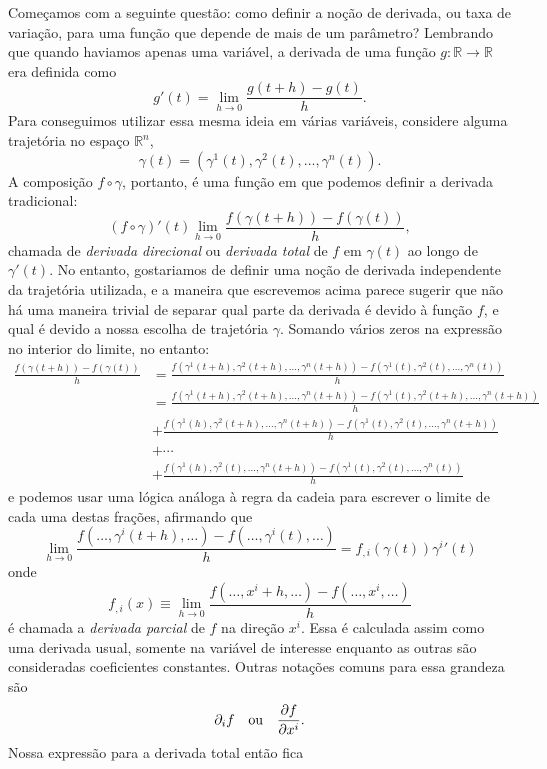 \documentclass[a4paper, 12pt]{article}
\newcommand{\pd}[3]{\ifblank{#3}{}{\left(}\frac{\partial #1}{\partial #2}\ifblank{#3}{}{\right)_{#3}}}
\theoremstyle{definition}
\theoremstyle{definition}
\begin{document}
Começamos com a seguinte questão: como definir a noção de derivada, ou taxa de variação, para uma função que
depende de mais de um parâmetro? Lembrando que quando haviamos apenas uma variável, a derivada de uma função
$g:\mathbb R\rightarrow\mathbb R$ era definida como
$$g'(t)=\lim\limits_{h\rightarrow0}\frac{g(t+h)-g(t)}{h}.$$
Para conseguimos utilizar essa mesma ideia em várias variáveis, considere alguma trajetória no espaço 
$\mathbb R^n$,
$$\gamma(t)=(\gamma^1(t),\gamma^2(t),\dots,\gamma^n(t)).$$
A composição $f\circ\gamma$, portanto, é uma função em que podemos definir a derivada tradicional:
$$(f\circ\gamma)'(t)\lim\limits_{h\rightarrow0}\frac{f(\gamma(t+h))-f(\gamma(t))}{h},$$
chamada de \textit{derivada direcional} ou \textit{derivada total} de $f$ em $\gamma(t)$ ao longo de $\gamma'(t)$. 
No entanto, gostariamos de definir uma noção de derivada independente da trajetória utilizada, e a maneira 
que escrevemos acima parece sugerir que não há uma maneira trivial de separar qual parte da derivada é devido à função $f$,
e qual é devido a nossa escolha de trajetória $\gamma$. Somando vários zeros na expressão no interior do limite, 
no entanto:
\begin{align*}
    \frac{f(\gamma(t+h))-f(\gamma(t))}{h}
    &=\frac{f(\gamma^1(t+h),\gamma^2(t+h),\dots,\gamma^n(t+h))-f(\gamma^1(t),\gamma^2(t),\dots,\gamma^n(t))}{h}\\
    &=\frac{f(\gamma^1(t+h),\gamma^2(t+h),\dots,\gamma^n(t+h))-f(\gamma^1(t),\gamma^2(t+h),\dots,\gamma^n(t+h))}{h}\\
    &+\frac{f(\gamma^1(h),\gamma^2(t+h),\dots,\gamma^n(t+h))-f(\gamma^1(t),\gamma^2(t),\dots,\gamma^n(t+h))}{h}\\
    &+\cdots\\
    &+\frac{f(\gamma^1(h),\gamma^2(t),\dots,\gamma^n(t+h))-f(\gamma^1(t),\gamma^2(t),\dots,\gamma^n(t))}{h}
\end{align*}
e podemos usar uma lógica análoga à regra da cadeia para escrever o limite de cada uma destas frações,
afirmando que
$$\lim\limits_{h\rightarrow0}\frac{f(\dots,\gamma^i(t+h),\dots)
-f(\dots,\gamma^i(t),\dots)}{h}=f_{,i}(\gamma(t))\gamma^i{'}(t)$$
onde
$$f_{,i}(x)\equiv\lim\limits_{h\rightarrow0}\frac{f(\dots,x^i+h,\dots)-f(\dots,x^i,\dots)}{h}$$
é chamada a \textit{derivada parcial} de $f$ na direção $x^i$. Essa é calculada assim como uma derivada
usual, somente na variável de interesse enquanto as outras são consideradas coeficientes constantes.
Outras notações comuns para essa grandeza são
$$\partial_i f\quad\text{ou}\quad\pd{f}{x^i}{}.$$
Nossa expressão para a derivada total então fica
\end{document}
